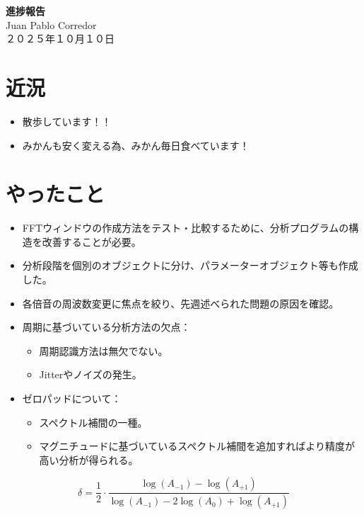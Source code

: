 \documentclass[a4paper, 11pt]{article}
\begin{document}
\begin{center}
    {\LARGE \bfseries 進捗報告} \\ %
    \vspace{0.3em} %
    Juan Pablo Corredor \\ %
    ２０２５年１０月１０日 %
\end{center}
\vspace{0.5em} %

\section*{近況}
\begin{itemize}
    \item 散歩しています！！
    \item みかんも安く変える為、みかん毎日食べています！
\end{itemize} 

\section*{やったこと}
\begin{itemize}
    \item FFTウィンドウの作成方法をテスト・比較するために、分析プログラムの構造を改善することが必要。
    \item 分析段階を個別のオブジェクトに分け、パラメーターオブジェクト等も作成した。
    \item 各倍音の周波数変更に焦点を絞り、先週述べられた問題の原因を確認。
    \item 周期に基づいている分析方法の欠点：
    \begin{itemize}
        \item 周期認識方法は無欠でない。
        \item Jitterやノイズの発生。
    \end{itemize}
    \item ゼロパッドについて：
    \begin{itemize}
        \item スペクトル補間\cite{spectralInterpolation}の一種。
        \item マグニチュードに基づいているスペクトル補間を追加すればより精度が高い分析が得られる。
    \end{itemize}
\end{itemize}

\[
\delta = \frac{1}{2} \cdot
\frac{\log(A_{-1}) - \log(A_{+1})}
{\log(A_{-1}) - 2\log(A_0) + \log(A_{+1})}
\]
\end{document}
